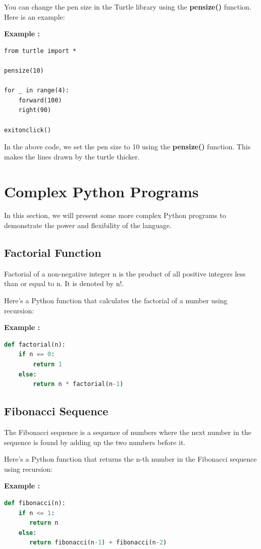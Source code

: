 \documentclass[12pt]{book}
\newtheorem{Example}{Example}[chapter]
\renewenvironment{Example}{\begin{trivlist}\item\relax
\textbf{Example \thesection: }}{\end{trivlist}}
\begin{document}
You can change the pen size in the Turtle library using the \textbf{pensize()} function. Here is an example:

\begin{Example}
\begin{lstlisting}
from turtle import *

pensize(10)

for _ in range(4):
    forward(100)
    right(90)

exitonclick()
\end{lstlisting}
\end{Example}

In the above code, we set the pen size to 10 using the \textbf{pensize()} function. This makes the lines drawn by the turtle thicker.

\newpage
\chapter{Complex Python Programs}
In this section, we will present some more complex Python programs to demonstrate the power and flexibility of the language.

\section{Factorial Function}
Factorial of a non-negative integer n is the product of all positive integers less than or equal to n. It is denoted by n!.


Here's a Python function that calculates the factorial of a number using recursion:
\begin{Example}
\begin{lstlisting}[language=Python]
def factorial(n):
    if n == 0:
        return 1
    else:
        return n * factorial(n-1)
\end{lstlisting}
\end{Example}

\section{Fibonacci Sequence}
The Fibonacci sequence is a sequence of numbers where the next number in the sequence is found by adding up the two numbers before it.


Here's a Python function that returns the n-th number in the Fibonacci sequence using recursion:
\begin{Example}
\begin{lstlisting}[language=Python]
def fibonacci(n):
    if n <= 1:
       return n
    else:
       return fibonacci(n-1) + fibonacci(n-2)
\end{lstlisting}
\end{Example}
\end{document}
